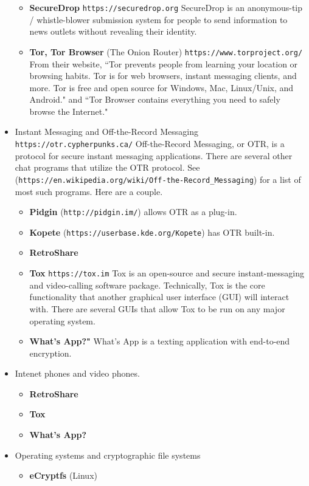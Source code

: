 \begin{itemize}
\begin{itemize}
			\item {\bf SecureDrop} {\tt https://securedrop.org} SecureDrop is an anonymous-tip / whistle-blower submission system for people to send information to news outlets without revealing their identity.
			\item {\bf Tor, Tor Browser} (The Onion Router) {\tt https://www.torproject.org/} From their website, ``Tor prevents people from learning your location or browsing habits. Tor is for web browsers, instant messaging clients, and more. Tor is free and open source for Windows, Mac, Linux/Unix, and Android." and ``Tor Browser contains everything you need to safely browse the Internet."
		\end{itemize}
		\item Instant Messaging and Off-the-Record Messaging {\tt https://otr.cypherpunks.ca/} Off-the-Record Messaging, or OTR, is a protocol for secure instant messaging applications. There are several other chat programs that utilize the OTR protocol. See  ({\tt https://en.wikipedia.org/wiki/Off-the-Record\_Messaging}) for a list of most such programs. Here are a couple.
		\begin{itemize}
			\item {\bf Pidgin} ({\tt http://pidgin.im/}) allows OTR as a plug-in.
			\item {\bf Kopete} ({\tt https://userbase.kde.org/Kopete}) has OTR built-in.
			\item {\bf RetroShare}
			\item {\bf Tox} {\tt https://tox.im} Tox is an open-source and secure instant-messaging and video-calling software package. Technically, Tox is the core functionality that another graphical user interface (GUI) will interact with. There are several GUIs that allow Tox to be run on any major operating system.
			\item {\bf What's App?"} What's App is a texting application with end-to-end encryption.
		\end{itemize}
		\item Intenet phones and video phones.
		\begin{itemize}
			\item {\bf RetroShare}
			\item {\bf Tox}
			\item {\bf What's App?}
		\end{itemize}
		\item Operating systems and cryptographic file systems
		\begin{itemize}
			\item {\bf eCryptfs} (Linux)

\end{itemize}
\end{itemize}

